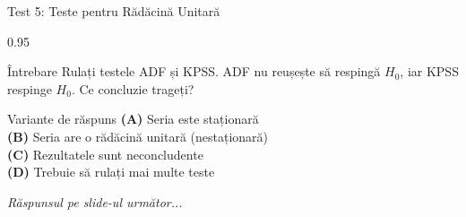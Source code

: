 \documentclass[9pt, aspectratio=169, t]{beamer}
\begin{document}
\begin{frame}{Test 5: Teste pentru Rădăcină Unitară}
    \begin{cminipage}{0.95\textwidth}
    \begin{alertblock}{Întrebare}
        Rulați testele ADF și KPSS. ADF nu reușește să respingă $H_0$, iar KPSS respinge $H_0$. Ce concluzie trageți?
    \end{alertblock}

    \vspace{0.4cm}

    \begin{block}{Variante de răspuns}
    \textcolor{MainBlue}{\textbf{(A)}} Seria este staționară\\[3pt]
    \textcolor{MainBlue}{\textbf{(B)}} Seria are o rădăcină unitară (nestaționară)\\[3pt]
    \textcolor{MainBlue}{\textbf{(C)}} Rezultatele sunt neconcludente\\[3pt]
    \textcolor{MainBlue}{\textbf{(D)}} Trebuie să rulați mai multe teste
    \end{block}
    \vspace{0.5cm}

    \begin{center}
        \textit{Răspunsul pe slide-ul următor...}
    \end{center}
    \end{cminipage}
\end{frame}
\end{document}
